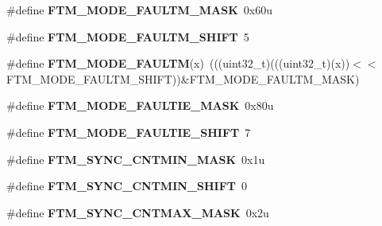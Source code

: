 \begin{DoxyCompactItemize}
\item 
\#define {\bfseries F\+T\+M\+\_\+\+M\+O\+D\+E\+\_\+\+F\+A\+U\+L\+T\+M\+\_\+\+M\+A\+SK}~0x60u\hypertarget{group__FTM__Register__Masks_ga8a3aedea37d5334fda2212d1f1424ce4}{}\label{group__FTM__Register__Masks_ga8a3aedea37d5334fda2212d1f1424ce4}

\item 
\#define {\bfseries F\+T\+M\+\_\+\+M\+O\+D\+E\+\_\+\+F\+A\+U\+L\+T\+M\+\_\+\+S\+H\+I\+FT}~5\hypertarget{group__FTM__Register__Masks_ga64d6ed5f33ee34eccdb66956a0bc1224}{}\label{group__FTM__Register__Masks_ga64d6ed5f33ee34eccdb66956a0bc1224}

\item 
\#define {\bfseries F\+T\+M\+\_\+\+M\+O\+D\+E\+\_\+\+F\+A\+U\+L\+TM}(x)~(((uint32\+\_\+t)(((uint32\+\_\+t)(x))$<$$<$F\+T\+M\+\_\+\+M\+O\+D\+E\+\_\+\+F\+A\+U\+L\+T\+M\+\_\+\+S\+H\+I\+FT))\&F\+T\+M\+\_\+\+M\+O\+D\+E\+\_\+\+F\+A\+U\+L\+T\+M\+\_\+\+M\+A\+SK)\hypertarget{group__FTM__Register__Masks_gae199f2cb5b5206cfc5fd06f4ad420759}{}\label{group__FTM__Register__Masks_gae199f2cb5b5206cfc5fd06f4ad420759}

\item 
\#define {\bfseries F\+T\+M\+\_\+\+M\+O\+D\+E\+\_\+\+F\+A\+U\+L\+T\+I\+E\+\_\+\+M\+A\+SK}~0x80u\hypertarget{group__FTM__Register__Masks_gab5bf6d3a31e69bc7806947c4650afa90}{}\label{group__FTM__Register__Masks_gab5bf6d3a31e69bc7806947c4650afa90}

\item 
\#define {\bfseries F\+T\+M\+\_\+\+M\+O\+D\+E\+\_\+\+F\+A\+U\+L\+T\+I\+E\+\_\+\+S\+H\+I\+FT}~7\hypertarget{group__FTM__Register__Masks_gac8de910f0297704ac0625948d59856d6}{}\label{group__FTM__Register__Masks_gac8de910f0297704ac0625948d59856d6}

\item 
\#define {\bfseries F\+T\+M\+\_\+\+S\+Y\+N\+C\+\_\+\+C\+N\+T\+M\+I\+N\+\_\+\+M\+A\+SK}~0x1u\hypertarget{group__FTM__Register__Masks_gaee5f107bf44191de4f5e747d4764e3ed}{}\label{group__FTM__Register__Masks_gaee5f107bf44191de4f5e747d4764e3ed}

\item 
\#define {\bfseries F\+T\+M\+\_\+\+S\+Y\+N\+C\+\_\+\+C\+N\+T\+M\+I\+N\+\_\+\+S\+H\+I\+FT}~0\hypertarget{group__FTM__Register__Masks_gacdc3ce84e897d0dd03b6ff7c483a6e4f}{}\label{group__FTM__Register__Masks_gacdc3ce84e897d0dd03b6ff7c483a6e4f}

\item 
\#define {\bfseries F\+T\+M\+\_\+\+S\+Y\+N\+C\+\_\+\+C\+N\+T\+M\+A\+X\+\_\+\+M\+A\+SK}~0x2u\hypertarget{group__FTM__Register__Masks_gae6aedee28d8bdb29e4f4a309e85ccdb0}{}\label{group__FTM__Register__Masks_gae6aedee28d8bdb29e4f4a309e85ccdb0}


\end{DoxyCompactItemize}
